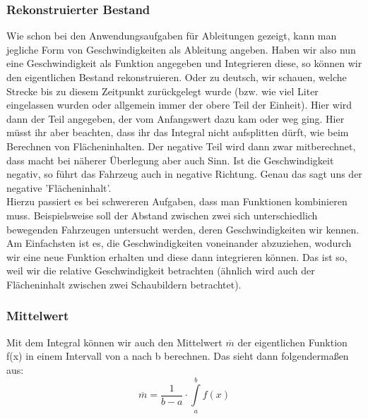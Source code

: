 	\subsubsection{Rekonstruierter Bestand}
		Wie schon bei den Anwendungsaufgaben für Ableitungen gezeigt, kann man
		jegliche Form von Geschwindigkeiten als Ableitung angeben. Haben wir also nun
		eine Geschwindigkeit als Funktion angegeben und Integrieren diese, so können
		wir den eigentlichen Bestand rekonstruieren. Oder zu deutsch, wir schauen,
		welche Strecke bis zu diesem Zeitpunkt zurückgelegt wurde (bzw. wie viel Liter
		eingelassen wurden oder allgemein immer der obere Teil der Einheit). Hier wird
		dann der Teil angegeben, der vom Anfangswert dazu kam oder weg ging. Hier
		müsst ihr aber beachten, dass ihr das Integral nicht aufsplitten dürft, wie
		beim Berechnen von Flächeninhalten. Der negative Teil wird dann zwar
		mitberechnet, dass macht bei näherer Überlegung aber auch Sinn. Ist die
		Geschwindigkeit negativ, so führt das Fahrzeug auch in negative Richtung.
		Genau das sagt uns der negative 'Flächeninhalt'.\\
		Hierzu passiert es bei schwereren Aufgaben, dass man Funktionen kombinieren
		muss. Beispielsweise soll der Abstand zwischen zwei sich unterschiedlich
		bewegenden Fahrzeugen untersucht werden, deren Geschwindigkeiten wir kennen.
		Am Einfachsten ist es, die Geschwindigkeiten voneinander abzuziehen, wodurch
		wir eine neue Funktion erhalten und diese dann integrieren können. Das ist so,
		weil wir die relative Geschwindigkeit betrachten (ähnlich wird auch der
		Flächeninhalt zwischen zwei Schaubildern betrachtet).

	\subsubsection{Mittelwert}
		Mit dem Integral können wir auch den Mittelwert \(\overline{m}\) der
		eigentlichen Funktion f(x) in einem Intervall von a nach b berechnen. Das
		sieht dann folgendermaßen aus:
		\[\overline{m}=\frac{1}{b-a}\cdot \int\limits_a^b f(x)\]
